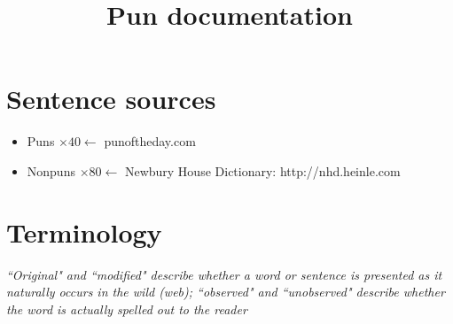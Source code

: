 \documentclass{article}
\begin{document}
\title{Pun documentation}
\maketitle

\section{Sentence sources}
\begin{itemize}
\item[] Puns $\times 40 \leftarrow$ punoftheday.com
\item[] Nonpuns $\times 80 \leftarrow$ Newbury House Dictionary: http://nhd.heinle.com
\end{itemize}

\section{Terminology}

\emph{``Original" and ``modified" describe whether a word or sentence is presented as it naturally occurs in the wild (web); ``observed" and ``unobserved" describe whether the word is actually spelled out to the reader}
\end{document}
